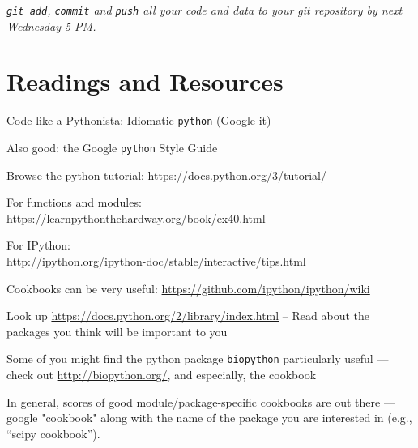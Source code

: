 \begin{center}
	\it {\tt git add}, {\tt commit} and {\tt push} all your code and data 
	to your git repository by next Wednesday 5 PM.
\end{center}
   
\section{Readings and Resources}

\begin{compactitem} \itemsep10pt
	\item Code like a Pythonista: Idiomatic {\tt python} (Google it)
	\item Also good: the Google {\tt python} Style Guide
	\item Browse the python tutorial: \url{https://docs.python.org/3/tutorial/}
	\item For functions and modules:\\
	\url{https://learnpythonthehardway.org/book/ex40.html}
	\item For IPython:\\
		\url{http://ipython.org/ipython-doc/stable/interactive/tips.html}
  \item Cookbooks can be very useful: 
  \url{https://github.com/ipython/ipython/wiki}
	\item Look up \url{https://docs.python.org/2/library/index.html} -- Read 
	about the packages you think will be important to you
	\item Some of you might find the python package {\tt biopython} 
	particularly useful --- check out \url{http://biopython.org/}, and especially, the cookbook
\end{compactitem}
In general, scores of good module/package-specific cookbooks are out there --- google "cookbook" along with the name of the package you are interested in (e.g., ``scipy cookbook'').

